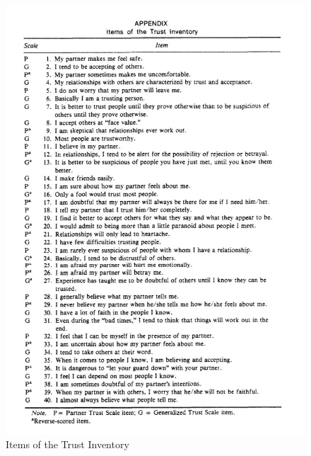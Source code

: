 \documentclass[a4paper,11pt]{article}%
\renewcommand{\\}{\vspace*{0.5\baselineskip} \newline}
\begin{document}
	\begin{figure}[H]
		\begin{footnotesize}
			\includegraphics[width=\textwidth]{Abbildungen/CouchEtAl_1996_TrustScale}\\
			\caption[Abbildung 1]{Items of the Trust Inventory \citep[305-323]{couch1996assessment}}
			\label{Trust-Inventory}
		\end{footnotesize}
	\end{figure}
	
	\newpage



\end{document}
